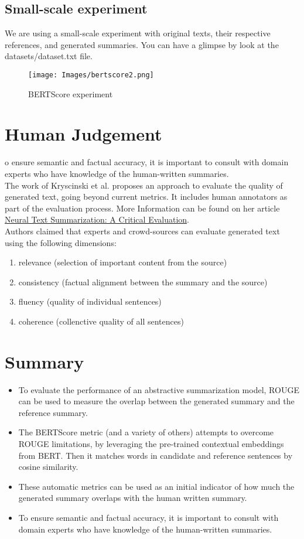 {\subsection{Small-scale experiment}
We are using a small-scale experiment with original texts, their respective references, and generated summaries. You can have a glimpse by look at the datasets/dataset.txt file.\\
\begin{figure}[h]
    \centering
    \texttt{[image: Images/bertscore2.png]}
    \caption{BERTScore experiment}
    \label{fig:bertscore2}
\end{figure}
\section{Human Judgement}
o ensure semantic and factual accuracy, it is important to consult with domain experts who have knowledge of the human-written summaries.\\

\noindent The work of Kryscinski et al. proposes an approach to evaluate the quality of generated text, going beyond current metrics. It includes human annotators as part of the evaluation process. More Information can be found on her article \href{https://arxiv.org/pdf/1908.08960.pdf}{Neural Text Summarization: A Critical Evaluation}.\\

\noindent Authors claimed that experts and crowd-sources can evaluate generated text using the following dimensions:
\begin{enumerate}
    \item relevance (selection of important content from the source)
    \item consistency (factual alignment between the summary and the source)
    \item fluency (quality of individual sentences)
    \item coherence (collenctive quality of all sentences)
\end{enumerate}
\section{Summary}
\begin{itemize}
    \item To evaluate the performance of an abstractive summarization model, ROUGE can be used to measure the overlap between the generated summary and the reference summary.
    \item The BERTScore metric (and a variety of others) attempts to overcome ROUGE limitations, by leveraging the pre-trained contextual embeddings from BERT. Then it matches words in candidate and reference sentences by cosine similarity.
    \item These automatic metrics can be used as an initial indicator of how much the generated summary overlaps with the human written summary.
    \item To ensure semantic and factual accuracy, it is important to consult with domain experts who have knowledge of the human-written summaries.
\end{itemize}
}
